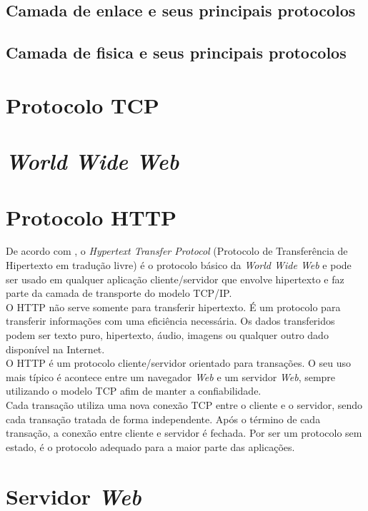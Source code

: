 \subsection{Camada de enlace e seus principais protocolos}
\subsection{Camada de fisica e seus principais protocolos}

\section{Protocolo TCP}

\section{\textit{World Wide Web}}

\section{Protocolo HTTP}
De acordo com \cite{stallings2005}, o \textit{Hypertext Transfer Protocol} (Protocolo de Transferência de Hipertexto em tradução livre) é o protocolo básico da \textit{World Wide Web} e pode ser usado em qualquer aplicação cliente/servidor que envolve hipertexto e faz parte da camada de transporte do modelo TCP/IP.\\
O HTTP não serve somente para transferir hipertexto. É um protocolo para transferir informações com uma eficiência necessária. Os dados transferidos podem ser texto puro, hipertexto, áudio, imagens ou qualquer outro dado disponível na Internet.\\
O HTTP é um protocolo cliente/servidor orientado para transações. O seu uso mais típico é acontece entre um navegador \textit{Web} e um servidor \textit{Web}, sempre utilizando o modelo TCP afim de manter a confiabilidade.\\
Cada transação utiliza uma nova conexão TCP entre o cliente e o servidor, sendo cada transação tratada de forma independente. Após o término de cada transação, a conexão entre cliente e servidor é fechada. Por ser um protocolo sem estado, é o protocolo adequado para a maior parte das aplicações.

\section{Servidor \textit{Web}}
